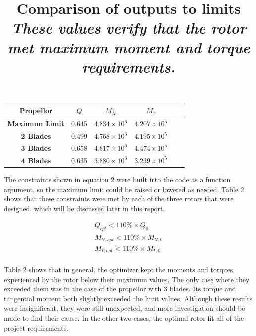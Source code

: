 \documentclass{article}
\begin{document}
\begin{table}[bp]
	\centering
	\title{Comparison of outputs to limits \newline}
	\title{\emph{These values verify that the rotor met maximum moment and torque requirements.}} \label{table:1} \newline
	\begin{tabular}{| c | c | c | c | c | c |}
		 \hline
  		 \textbf{Propellor} & \textbf{$Q$} & \textbf{$M_{N}$} & \textbf{$M_{T}$} \\ \hline
		 \textbf{Maximum Limit} & 0.645 & $4.834 \times 10^{6}$ & $4.207 \times 10^{5}$ \\
		 \textbf{2 Blades} & 0.499 & $4.768 \times 10^{6}$ & $4.195 \times 10^{5}$ \\
		 \textbf{3 Blades} & 0.658 & $4.817 \times 10^{6}$ & $4.474 \times 10^{5}$ \\
		 \textbf{4 Blades} & 0.635 & $3.880 \times 10^{6}$ & $3.239 \times 10^{5}$ \\ \hline
	\end{tabular}
\end{table}

The constraints shown in equation 2 were built into the code as a function argument, so the maximum limit could be raised or lowered as needed. Table 2 shows that these constraints were met by each of the three rotors that were designed, which will be discussed later in this report. \newline

\begin{equation}
\begin{aligned}
	Q_{opt} < 110\% \times Q_{0} \\
	M_{N,opt} < 110\% \times M_{N,0} \\
	M_{T,opt} < 110\% \times M_{T,0} \\
\end{aligned}
\end{equation} 

Table 2 shows that in general, the optimizer kept the moments and torques experienced by the rotor below their maximum values. The only case where they exceeded them was in the case of the propellor with 3 blades. Its torque and tangential moment both slightly exceeded the limit values. Although these results were insignificant, they were still unexpected, and more investigation should be made to find their cause. In the other two cases, the optimal rotor fit all of the project requirements. \newline
\end{document}
